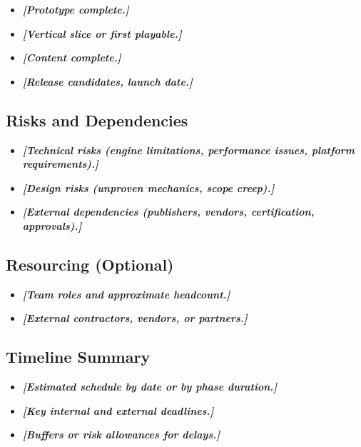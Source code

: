 \documentclass[12pt]{article}
\newcommand{\placeholder}[1]{\textbf{\textit{[#1]}}}
\begin{document}
\begin{itemize}
    \item \placeholder{Prototype complete.}
    \item \placeholder{Vertical slice or first playable.}
    \item \placeholder{Content complete.}
    \item \placeholder{Release candidates, launch date.}
\end{itemize}

\subsection{Risks and Dependencies}

\begin{itemize}
    \item \placeholder{Technical risks (engine limitations, performance issues, platform requirements).}
    \item \placeholder{Design risks (unproven mechanics, scope creep).}
    \item \placeholder{External dependencies (publishers, vendors, certification, approvals).}
\end{itemize}

\subsection{Resourcing (Optional)}

\begin{itemize}
    \item \placeholder{Team roles and approximate headcount.}
    \item \placeholder{External contractors, vendors, or partners.}
\end{itemize}

\subsection{Timeline Summary}

\begin{itemize}
    \item \placeholder{Estimated schedule by date or by phase duration.}
    \item \placeholder{Key internal and external deadlines.}
    \item \placeholder{Buffers or risk allowances for delays.}
\end{itemize}

\end{document}
